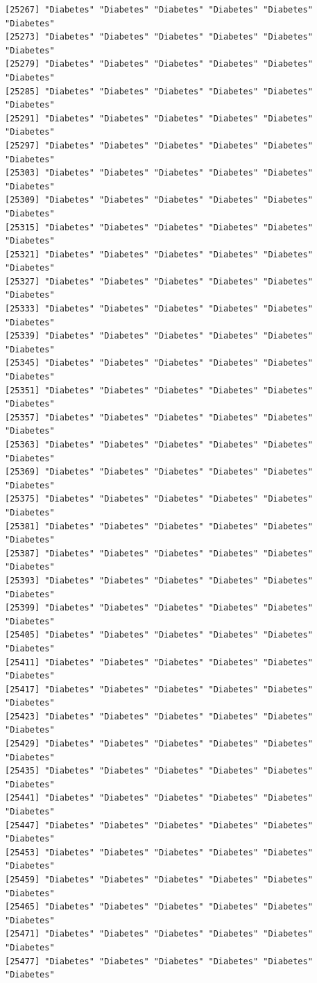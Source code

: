 \documentclass[
  letterpaper,
  DIV=11,
  numbers=noendperiod]{scrartcl}
\begin{document}
\begin{verbatim}
[25267] "Diabetes" "Diabetes" "Diabetes" "Diabetes" "Diabetes" "Diabetes"
[25273] "Diabetes" "Diabetes" "Diabetes" "Diabetes" "Diabetes" "Diabetes"
[25279] "Diabetes" "Diabetes" "Diabetes" "Diabetes" "Diabetes" "Diabetes"
[25285] "Diabetes" "Diabetes" "Diabetes" "Diabetes" "Diabetes" "Diabetes"
[25291] "Diabetes" "Diabetes" "Diabetes" "Diabetes" "Diabetes" "Diabetes"
[25297] "Diabetes" "Diabetes" "Diabetes" "Diabetes" "Diabetes" "Diabetes"
[25303] "Diabetes" "Diabetes" "Diabetes" "Diabetes" "Diabetes" "Diabetes"
[25309] "Diabetes" "Diabetes" "Diabetes" "Diabetes" "Diabetes" "Diabetes"
[25315] "Diabetes" "Diabetes" "Diabetes" "Diabetes" "Diabetes" "Diabetes"
[25321] "Diabetes" "Diabetes" "Diabetes" "Diabetes" "Diabetes" "Diabetes"
[25327] "Diabetes" "Diabetes" "Diabetes" "Diabetes" "Diabetes" "Diabetes"
[25333] "Diabetes" "Diabetes" "Diabetes" "Diabetes" "Diabetes" "Diabetes"
[25339] "Diabetes" "Diabetes" "Diabetes" "Diabetes" "Diabetes" "Diabetes"
[25345] "Diabetes" "Diabetes" "Diabetes" "Diabetes" "Diabetes" "Diabetes"
[25351] "Diabetes" "Diabetes" "Diabetes" "Diabetes" "Diabetes" "Diabetes"
[25357] "Diabetes" "Diabetes" "Diabetes" "Diabetes" "Diabetes" "Diabetes"
[25363] "Diabetes" "Diabetes" "Diabetes" "Diabetes" "Diabetes" "Diabetes"
[25369] "Diabetes" "Diabetes" "Diabetes" "Diabetes" "Diabetes" "Diabetes"
[25375] "Diabetes" "Diabetes" "Diabetes" "Diabetes" "Diabetes" "Diabetes"
[25381] "Diabetes" "Diabetes" "Diabetes" "Diabetes" "Diabetes" "Diabetes"
[25387] "Diabetes" "Diabetes" "Diabetes" "Diabetes" "Diabetes" "Diabetes"
[25393] "Diabetes" "Diabetes" "Diabetes" "Diabetes" "Diabetes" "Diabetes"
[25399] "Diabetes" "Diabetes" "Diabetes" "Diabetes" "Diabetes" "Diabetes"
[25405] "Diabetes" "Diabetes" "Diabetes" "Diabetes" "Diabetes" "Diabetes"
[25411] "Diabetes" "Diabetes" "Diabetes" "Diabetes" "Diabetes" "Diabetes"
[25417] "Diabetes" "Diabetes" "Diabetes" "Diabetes" "Diabetes" "Diabetes"
[25423] "Diabetes" "Diabetes" "Diabetes" "Diabetes" "Diabetes" "Diabetes"
[25429] "Diabetes" "Diabetes" "Diabetes" "Diabetes" "Diabetes" "Diabetes"
[25435] "Diabetes" "Diabetes" "Diabetes" "Diabetes" "Diabetes" "Diabetes"
[25441] "Diabetes" "Diabetes" "Diabetes" "Diabetes" "Diabetes" "Diabetes"
[25447] "Diabetes" "Diabetes" "Diabetes" "Diabetes" "Diabetes" "Diabetes"
[25453] "Diabetes" "Diabetes" "Diabetes" "Diabetes" "Diabetes" "Diabetes"
[25459] "Diabetes" "Diabetes" "Diabetes" "Diabetes" "Diabetes" "Diabetes"
[25465] "Diabetes" "Diabetes" "Diabetes" "Diabetes" "Diabetes" "Diabetes"
[25471] "Diabetes" "Diabetes" "Diabetes" "Diabetes" "Diabetes" "Diabetes"
[25477] "Diabetes" "Diabetes" "Diabetes" "Diabetes" "Diabetes" "Diabetes"

\end{verbatim}
\end{document}
